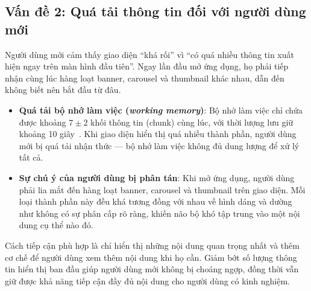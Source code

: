 \subsection{Vấn đề 2: Quá tải thông tin đối với người dùng mới}

Người dùng mới cảm thấy giao diện ``khá rối'' vì ``có quá nhiều thông tin xuất hiện ngay trên màn hình đầu tiên''. Ngay lần đầu mở ứng dụng, họ phải tiếp nhận cùng lúc hàng loạt banner, carousel và thumbnail khác nhau, dẫn đến không biết nên bắt đầu từ đâu.

\begin{itemize}[leftmargin=*, nosep]
    \item \textbf{Quá tải bộ nhớ làm việc (\textit{working memory})}: Bộ nhớ làm việc chỉ chứa được khoảng $7 \pm 2$ khối thông tin (chunk) cùng lúc, với thời lượng lưu giữ khoảng 10 giây~\cite{miller1956}. Khi giao diện hiển thị quá nhiều thành phần, người dùng mới bị quá tải nhận thức — bộ nhớ làm việc không đủ dung lượng để xử lý tất cả.
    \item \textbf{Sự chú ý của người dùng bị phân tán}: Khi mở ứng dụng, người dùng phải lia mắt đến hàng loạt banner, carousel và thumbnail trên giao diện. Mỗi loại thành phần này đều khá tương đồng với nhau về hình dáng và dường như không có sự phân cấp rõ ràng, khiến não bộ khó tập trung vào một nội dung cụ thể nào đó.
\end{itemize}

Cách tiếp cận phù hợp là chỉ hiển thị những nội dung quan trọng nhất và thêm cơ chế để người dùng xem thêm nội dung khi họ cần. Giảm bớt số lượng thông tin hiển thị ban đầu giúp người dùng mới không bị choáng ngợp, đồng thời vẫn giữ được khả năng tiếp cận đầy đủ nội dung cho người dùng có kinh nghiệm.
